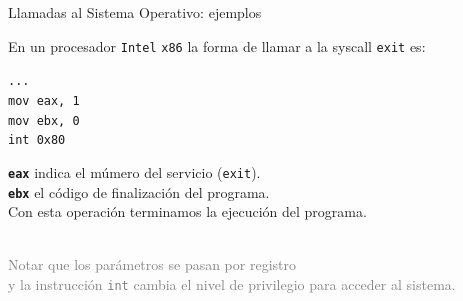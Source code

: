 \documentclass[aspectratio=169]{beamer}
\begin{document}
\begin{frame}[fragile]{Llamadas al Sistema Operativo: ejemplos}
\begin{textblock}{65}
\begin{tcolorbox}[size=small,width=\textwidth,sharp corners,title={\footnotesize Ejemplo}]
    \footnotesize
    En un procesador \texttt{Intel} \texttt{x86} la forma de llamar a la syscall \texttt{exit} es:
    \begin{tcolorbox}[left skip=2.2cm,size=fbox,colback={verdeuca!30},width=2cm,sharp corners,title={}]
    \verb|...|\\
    \verb|mov eax, 1|\\
    \verb|mov ebx, 0|\\
    \verb|int 0x80|
    \end{tcolorbox}
    \textcolor{naranjauca}{\textbf{\texttt{eax}}} indica el múmero del servicio (\texttt{exit}).\\
    \textcolor{naranjauca}{\textbf{\texttt{ebx}}} el código de finalización del programa.\\
    Con esta operación terminamos la ejecución del programa.\\ \\
    \end{tcolorbox}
    \small
    \textcolor{gray}{Notar que los parámetros se pasan por registro\\
    y la instrucción \texttt{int} cambia el nivel de privilegio para acceder al sistema.}
    \end{textblock}
\end{frame}
\end{document}
